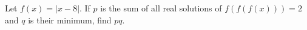 Let $f(x)=|x-8|$. If $p$ is the sum of all real solutions of $f(f(f(x)))=2$ and $q$ is their minimum, find $pq$.
